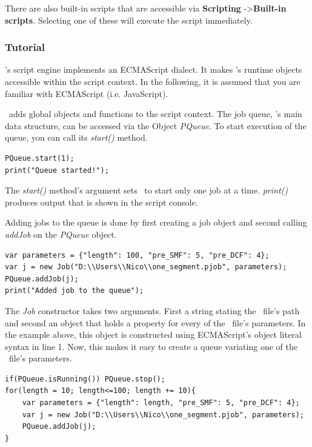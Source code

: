 There are also built-in scripts that are accessible via \textbf{Scripting} -\textgreater \textbf{Built-in scripts}.
Selecting one of these will execute the script immediately.



\subsubsection{Tutorial}
\label{pqueue:scripts:tutorial}
\PQUEUE's script engine implements an ECMAScript dialect.
It makes \PQUEUE's runtime objects accessible within the script context.
In the following, it is assumed that you are familiar with ECMAScript (i.e. JavaScript).\bb

\PQUEUE\ adds global objects and functions to the script context.
The job queue, \PQUEUE's main data structure, can be accessed via the Object \textit{PQueue}.
To start execution of the queue, you can call its \textit{start()} method.
\begin{lstlisting}
PQueue.start(1);
print("Queue started!");
\end{lstlisting}
The \textit{start()} method's argument sets \PQUEUE\ to start only one job at a time.
\textit{print()} produces output that is shown in the script console.\bb

Adding jobs to the queue is done by first creating a job object
and second calling \textit{addJob} on the \textit{PQueue} object.
\begin{lstlisting}
var parameters = {"length": 100, "pre_SMF": 5, "pre_DCF": 4};
var j = new Job("D:\\Users\\Nico\\one_segment.pjob", parameters);
PQueue.addJob(j);
print("Added job to the queue");
\end{lstlisting}
The \textit{Job} constructor takes two arguments.
First a string stating the \PJOB\ file's path
and second an object that holds a property for every of the \PJOB\ file's parameters.
In the example above, this object is constructed using ECMAScript's object literal syntax in line 1.
Now, this makes it easy to create a queue variating one of the \PJOB\ file's parameters.
\begin{lstlisting}
if(PQueue.isRunning()) PQueue.stop();
for(length = 10; length<=100; length += 10){
	var parameters = {"length": length, "pre_SMF": 5, "pre_DCF": 4};
	var j = new Job("D:\\Users\\Nico\\one_segment.pjob", parameters);
	PQueue.addJob(j);
}
\end{lstlisting}\bb

